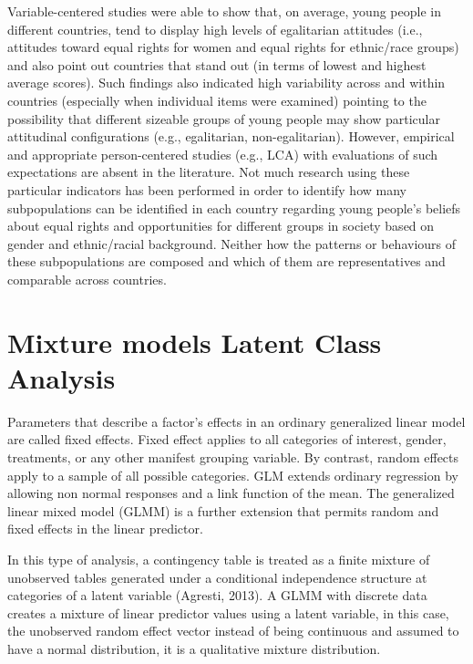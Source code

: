 \documentclass[12pt,a4paper,oneside]{reedthesis}
\begin{document}
Variable-centered studies were able to show that, on average, young people in different countries, tend to display high levels of egalitarian attitudes (i.e., attitudes toward equal rights for women and equal rights for ethnic/race groups) and also point out countries that stand out (in terms of lowest and highest average scores). Such findings also indicated high variability across and within countries (especially when individual items were examined) pointing to the possibility that different sizeable groups of young people may show particular attitudinal configurations (e.g., egalitarian, non-egalitarian). However, empirical and appropriate person-centered studies (e.g., LCA) with evaluations of such expectations are absent in the literature. Not much research using these particular indicators has been performed in order to identify how many subpopulations can be identified in each country regarding young people's beliefs about equal rights and opportunities for different groups in society based on gender and ethnic/racial background. Neither how the patterns or behaviours of these subpopulations are composed and which of them are representatives and comparable across countries.

\hypertarget{mixture-models-latent-class-analysis}{%
\section{Mixture models Latent Class Analysis}\label{mixture-models-latent-class-analysis}}

Parameters that describe a factor's effects in an ordinary generalized linear model are called fixed effects. Fixed effect applies to all categories of interest, gender, treatments, or any other manifest grouping variable. By contrast, random effects apply to a sample of all possible categories. GLM extends ordinary regression by allowing non normal responses and a link function of the mean. The generalized linear mixed model (GLMM) is a further extension that permits random and fixed effects in the linear predictor.

In this type of analysis, a contingency table is treated as a finite mixture of unobserved tables generated under a conditional independence structure at categories of a latent variable (Agresti, 2013).
A GLMM with discrete data creates a mixture of linear predictor values using a latent variable, in this case, the unobserved random effect vector instead of being continuous and assumed to have a normal distribution, it is a qualitative mixture distribution.
\end{document}
